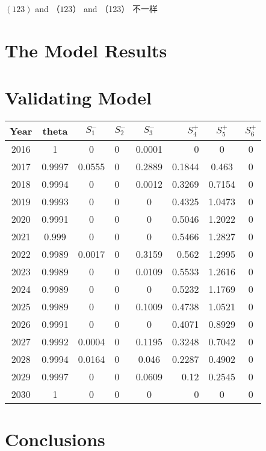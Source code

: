 \documentclass{mcmthesis}
\begin{document}
$\left(123 \right)$ and $ （123） $ and （123） 不一样


\section{The Model Results}
\lipsum[4]

\section{Validating Model}

\begin{center}
\begin{tabular}{c|cclcrcc}
\hline
\hline
Year & theta & $S_1^-$ & $S_2^-$ & $S_3^-$ & $S_4^+$ & $S_5^+$ & $S_6^+$ \\			%
\hline
2016 & 1      & 0      & 0 & 0.0001 & 0      & 0      & 0 \\
2017 & 0.9997 & 0.0555 & 0 & 0.2889 & 0.1844 & 0.463  & 0 \\
2018 & 0.9994 & 0      & 0 & 0.0012 & 0.3269 & 0.7154 & 0 \\
2019 & 0.9993 & 0      & 0 & 0      & 0.4325 & 1.0473 & 0 \\
2020 & 0.9991 & 0      & 0 & 0      & 0.5046 & 1.2022 & 0 \\
2021 & 0.999  & 0      & 0 & 0      & 0.5466 & 1.2827 & 0 \\
2022 & 0.9989 & 0.0017 & 0 & 0.3159 & 0.562  & 1.2995 & 0 \\
2023 & 0.9989 & 0      & 0 & 0.0109 & 0.5533 & 1.2616 & 0 \\
2024 & 0.9989 & 0      & 0 & 0      & 0.5232 & 1.1769 & 0 \\
2025 & 0.9989 & 0      & 0 & 0.1009 & 0.4738 & 1.0521 & 0 \\
2026 & 0.9991 & 0      & 0 & 0      & 0.4071 & 0.8929 & 0 \\
2027 & 0.9992 & 0.0004 & 0 & 0.1195 & 0.3248 & 0.7042 & 0 \\
2028 & 0.9994 & 0.0164 & 0 & 0.046  & 0.2287 & 0.4902 & 0 \\
2029 & 0.9997 & 0      & 0 & 0.0609 & 0.12   & 0.2545 & 0 \\
2030 & 1      & 0      & 0 & 0      & 0      & 0      & 0 \\
\hline
\hline
\end{tabular}
\end{center}

\section{Conclusions}
\lipsum[5]
\end{document}
